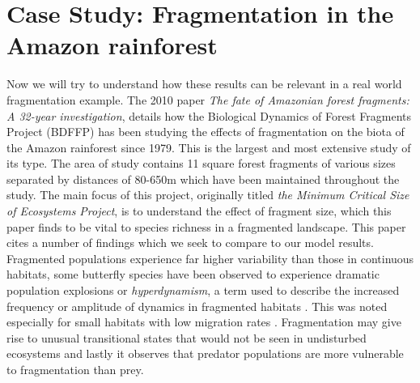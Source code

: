 \documentclass[12pt]{article}
\begin{document}
\section{Case Study: Fragmentation in the Amazon rainforest}\label{section:case study}
Now we will try to understand how these results can be relevant in a real world fragmentation example.
The 2010 paper \textit{The fate of Amazonian forest fragments: A 32-year investigation}, details how the Biological Dynamics of Forest Fragments Project (BDFFP) \cite{laurance2011} has been studying the effects of fragmentation on the biota of the Amazon rainforest since 1979. This is the largest and most extensive study of its type. The area of study contains 11 square forest fragments of various sizes separated by distances of 80-650m which have been maintained throughout the study. The main focus of this project, originally titled \textit{the Minimum Critical Size of Ecosystems Project}, is to understand the effect of fragment size, which this paper finds to be vital to species richness in a fragmented landscape. This paper cites a number of findings which we seek to compare to our model results. Fragmented populations experience far higher variability than those in continuous habitats, some butterfly species have been observed to experience dramatic population explosions or \textit{hyperdynamism}, a term used to describe the increased frequency or amplitude of dynamics in fragmented habitats \cite{leidner2010does,laurance2011}. This was noted especially for small habitats with low migration rates \cite{laurance2011}. Fragmentation may give rise to unusual transitional states that would not be seen in undisturbed ecosystems \cite{terborgh2001ecological} and lastly it observes that predator populations are more vulnerable to fragmentation than prey.
\end{document}
